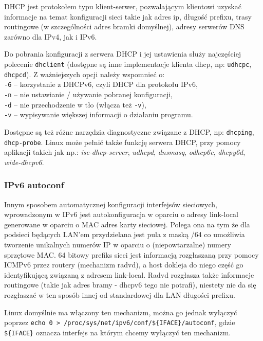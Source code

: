 DHCP jest protokołem typu klient-serwer, pozwalającym klientowi uzyskać informacje na temat konfiguracji sieci takie jak adres ip, długość prefixu, trasy routingowe (w szczególności adres bramki domyślnej), adresy serwerów DNS zarówno dla IPv4, jak i IPv6.

Do pobrania konfiguracji z serwera DHCP i jej ustawienia służy najczęściej polecenie \Verb#dhclient# (dostępne są inne implementacje klienta dhcp, np: \Verb#udhcpc#, \Verb#dhcpcd#).
Z ważniejszych opcji należy wspomnieć o:\\
	\hspace*{1cm} \Verb#-6# – korzystanie z DHCPv6, czyli DHCP dla protokołu IPv6,\\
	\hspace*{1cm} \Verb#-n# – nie ustawianie / używanie pobranej konfiguracji,\\
	\hspace*{1cm} \Verb#-d# – nie przechodzenie w tło (włącza też \Verb#-v#),\\
	\hspace*{1cm} \Verb#-v# – wypisywanie większej informacji o działaniu programu.

Dostępne są też różne narzędzia diagnostyczne związane z DHCP, np: \Verb#dhcping#, \Verb#dhcp-probe#.
Linux może pełnić także funkcję serwera DHCP, przy pomocy aplikacji takich jak np.: 
	\textit{isc-dhcp-server}, \textit{udhcpd}, \textit{dnsmasq}, \textit{odhcp6c}, \textit{dhcpy6d}, \textit{wide-dhcpv6}.

\subsubsection{IPv6 autoconf}

Innym sposobem automatycznej konfiguracji interfejsów sieciowych, wprowadzonym w IPv6 jest autokonfiguracja w oparciu o adresy link-local generowane w oparciu o MAC adres karty sieciowej.
	Polega ona na tym że dla podsieci będących LAN'em przydzielana jest pula z maską /64 co umożliwia tworzenie unikalnych numerów IP w oparciu o (niepowtarzalne) numery sprzętowe MAC.
	64 bitowy prefiks sieci jest informacją rozgłaszaną przy pomocy ICMPv6 przez routery (mechanizm radvd), a host dokleja do niego część go identyfikującą związaną z adresem link-local.
	Radvd rozgłasza także informacje routingowe (takie jak adres bramy - dhcpv6 tego nie potrafi), niestety nie da się rozgłaszać w ten sposób innej od standardowej dla LAN długości prefixu.

Linux domyślnie ma włączony ten mechanizm, można go jednak wyłączyć poprzez \Verb#echo 0 > /proc/sys/net/ipv6/conf/${IFACE}/autoconf#, gdzie \Verb#${IFACE}# oznacza interfejs na którym chcemy wyłączyć ten mechanizm.


